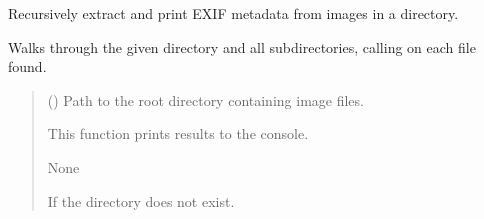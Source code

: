 \documentclass[letterpaper,10pt,english]{sphinxmanual}
\begin{document}
\begin{fulllineitems}
\label{\detokenize{modules/src.data_intake.data_intake.utils:src.data_intake.data_intake.utils.getMetaDataDir}}
\pysigstartsignatures
\pysiglinewithargsret
{}
{}
{}
\pysigstopsignatures
\sphinxAtStartPar
Recursively extract and print EXIF metadata from images in a directory.

\sphinxAtStartPar
Walks through the given directory and all subdirectories, calling
 on each file found.
\begin{quote}\begin{description}
\sphinxAtStartPar
{} () \textendash{} Path to the root directory containing image files.

\sphinxAtStartPar
This function prints results to the console.

\sphinxAtStartPar
None

\sphinxAtStartPar
{} \textendash{} If the directory does not exist.

\end{description}\end{quote}

\end{fulllineitems}

\end{document}
